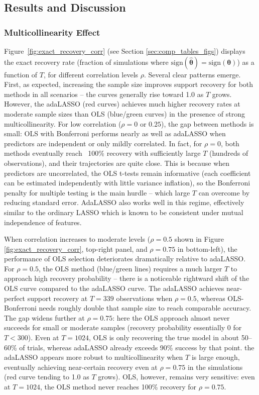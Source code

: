 \documentclass[10pt,a4paper,oneside]{article}
\begin{document}
\subsection{Results and Discussion}
\label{subsec:results_and_discussion}

\subsubsection{Multicollinearity Effect}

Figure~\ref{fig:exact_recovery_corr} (see Section \ref{sec:comp_tables_figs}) displays the exact recovery rate (fraction of simulations where $\mathrm{sign}(\hat{\boldsymbol{\theta}}) = \mathrm{sign}(\boldsymbol{\theta})$) as a function of $T$, for different correlation levels $\rho$. Several clear patterns emerge. First, as expected, increasing the sample size improves support recovery for both methods in all scenarios – the curves generally rise toward 1.0 as $T$ grows. However, the adaLASSO (red curves) achieves much higher recovery rates at moderate sample sizes than OLS (blue/green curves) in the presence of strong multicollinearity. For low correlation ($\rho=0$ or $0.25$), the gap between methods is small: OLS with Bonferroni performs nearly as well as adaLASSO when predictors are independent or only mildly correlated. In fact, for $\rho=0$, both methods eventually reach ~100\% recovery with sufficiently large $T$ (hundreds of observations), and their trajectories are quite close. This is because when predictors are uncorrelated, the OLS t-tests remain informative (each coefficient can be estimated independently with little variance inflation), so the Bonferroni penalty for multiple testing is the main hurdle – which large $T$ can overcome by reducing standard error. AdaLASSO also works well in this regime, effectively similar to the ordinary LASSO which is known to be consistent under mutual independence of features.

When correlation increases to moderate levels ($\rho=0.5$ shown in Figure \ref{fig:exact_recovery_corr}, top-right panel, and $\rho=0.75$ in bottom-left), the performance of OLS selection deteriorates dramatically relative to adaLASSO. For $\rho=0.5$, the OLS method (blue/green lines) requires a much larger $T$ to approach high recovery probability – there is a noticeable rightward shift of the OLS curve compared to the adaLASSO curve. The adaLASSO achieves near-perfect support recovery at $T = 339$ observations when $\rho=0.5$, whereas OLS-Bonferroni needs roughly double that sample size to reach comparable accuracy. The gap widens further at $\rho=0.75$: here the OLS approach almost never succeeds for small or moderate samples (recovery probability essentially 0 for $T < 300$). Even at $T = 1024$, OLS is only recovering the true model in about 50–60\% of trials, whereas adaLASSO already exceeds 90\% success by that point.  the adaLASSO appears more robust to multicollinearity when $T$ is large enough, eventually achieving near-certain recovery even at $\rho=0.75$ in the simulations (red curve tending to 1.0 as $T$ grows). OLS, however, remains very sensitive: even at $T=1024$, the OLS method never reaches 100\% recovery for $\rho=0.75$.
\end{document}
